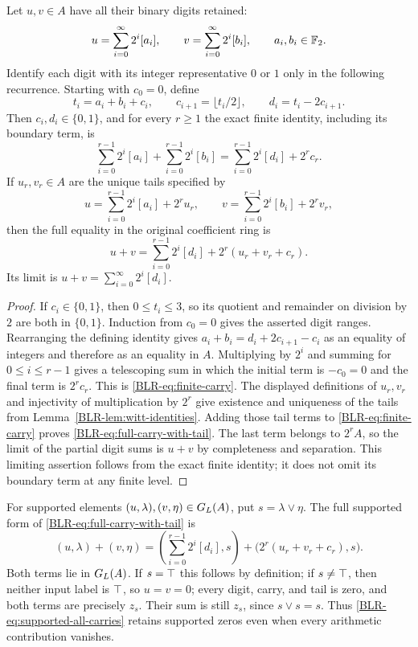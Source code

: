 \begin{proposition}\label{BLR-prop:all-carries}
Let $u,v\in A$ have all their binary digits retained:
\[
 u=\sum_{i=0}^\infty2^i[a_i],\qquad
 v=\sum_{i=0}^\infty2^i[b_i],\qquad a_i,b_i\in\mathbb F_2.
\]
Identify each digit with its integer representative $0$ or $1$ only in
the following recurrence. Starting with $c_0=0$, define
\begin{equation}\label{BLR-eq:carry-recurrence}
 t_i=a_i+b_i+c_i,\qquad
 c_{i+1}=\lfloor t_i/2\rfloor,\qquad d_i=t_i-2c_{i+1}.
\end{equation}
Then $c_i,d_i\in\{0,1\}$, and for every $r\geq1$ the exact finite
identity, including its boundary term, is
\begin{equation}\label{BLR-eq:finite-carry}
 \sum_{i=0}^{r-1}2^i[a_i]+\sum_{i=0}^{r-1}2^i[b_i]
 =\sum_{i=0}^{r-1}2^i[d_i]+2^r c_r.
\end{equation}
If $u_r,v_r\in A$ are the unique tails specified by
\[
 u=\sum_{i=0}^{r-1}2^i[a_i]+2^r u_r,\qquad
 v=\sum_{i=0}^{r-1}2^i[b_i]+2^r v_r,
\]
then the full equality in the original coefficient ring is
\begin{equation}\label{BLR-eq:full-carry-with-tail}
 u+v=\sum_{i=0}^{r-1}2^i[d_i]+2^r(u_r+v_r+c_r).
\end{equation}
Its limit is $u+v=\sum_{i=0}^\infty2^i[d_i]$.
\end{proposition}
\begin{proof}
If $c_i\in\{0,1\}$, then $0\leq t_i\leq3$, so its quotient and
remainder on division by $2$ are both in $\{0,1\}$. Induction from
$c_0=0$ gives the asserted digit ranges. Rearranging the defining
identity gives
$a_i+b_i=d_i+2c_{i+1}-c_i$ as an equality of integers and therefore as
an equality in $A$. Multiplying by $2^i$ and summing for
$0\leq i\leq r-1$ gives a telescoping sum in which the initial term is
$-c_0=0$ and the final term is $2^r c_r$. This is
\eqref{BLR-eq:finite-carry}. The displayed definitions of $u_r,v_r$ and
injectivity of multiplication by $2^r$ give existence and uniqueness of
the tails from Lemma~\ref{BLR-lem:witt-identities}. Adding those tail terms
to \eqref{BLR-eq:finite-carry} proves
\eqref{BLR-eq:full-carry-with-tail}. The last term belongs to $2^rA$, so the
limit of the partial digit sums is $u+v$ by completeness and separation.
This limiting assertion follows from the exact finite identity; it does
not omit its boundary term at any finite level.
\end{proof}

For supported elements $(u,\lambda),(v,\eta)\in G_L(A)$, put
$s=\lambda\vee\eta$. The full supported form of
\eqref{BLR-eq:full-carry-with-tail} is
\begin{equation}\label{BLR-eq:supported-all-carries}
 (u,\lambda)+(v,\eta)=
 \left(\sum_{i=0}^{r-1}2^i[d_i],s\right)
 +\bigl(2^r(u_r+v_r+c_r),s\bigr).
\end{equation}
Both terms lie in $G_L(A)$. If $s=\top$ this follows by definition;
if $s\ne\top$, then neither input label is $\top$, so $u=v=0$;
every digit, carry, and tail is zero, and both terms are precisely
$z_s$. Their sum is still $z_s$, since $s\vee s=s$. Thus
\eqref{BLR-eq:supported-all-carries} retains supported zeros even when every
arithmetic contribution vanishes.

